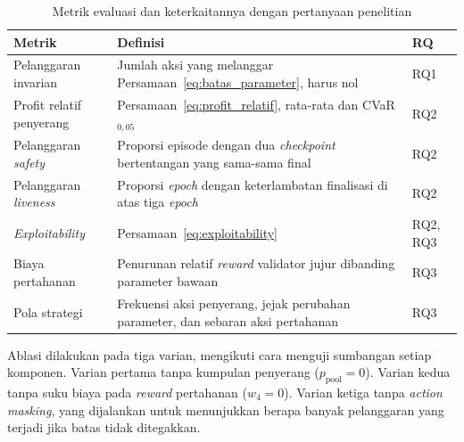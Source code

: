 \begin{table}[htbp]
\centering
\caption{Metrik evaluasi dan keterkaitannya dengan pertanyaan penelitian}
\label{tab:metrik}
\small
\begin{tabular}{|p{3.4cm}|p{6.6cm}|p{2.2cm}|}
\hline
\textbf{Metrik} & \textbf{Definisi} & \textbf{RQ} \\
\hline
Pelanggaran invarian & Jumlah aksi yang melanggar Persamaan~\eqref{eq:batas_parameter}, harus nol & RQ1 \\
\hline
Profit relatif penyerang & Persamaan~\eqref{eq:profit_relatif}, rata-rata dan CVaR$_{0{,}05}$ & RQ2 \\
\hline
Pelanggaran \textit{safety} & Proporsi episode dengan dua \textit{checkpoint} bertentangan yang sama-sama final & RQ2 \\
\hline
Pelanggaran \textit{liveness} & Proporsi \textit{epoch} dengan keterlambatan finalisasi di atas tiga \textit{epoch} & RQ2 \\
\hline
\textit{Exploitability} & Persamaan~\eqref{eq:exploitability} & RQ2, RQ3 \\
\hline
Biaya pertahanan & Penurunan relatif \textit{reward} validator jujur dibanding parameter bawaan & RQ3 \\
\hline
Pola strategi & Frekuensi aksi penyerang, jejak perubahan parameter, dan sebaran aksi pertahanan & RQ3 \\
\hline
\end{tabular}
\end{table}

Ablasi dilakukan pada tiga varian, mengikuti cara \textcite{wushishi2026coadam} menguji sumbangan setiap komponen. Varian pertama tanpa kumpulan penyerang ($p_{\text{pool}} = 0$). Varian kedua tanpa suku biaya pada \textit{reward} pertahanan ($w_4 = 0$). Varian ketiga tanpa \textit{action masking}, yang dijalankan untuk menunjukkan berapa banyak pelanggaran yang terjadi jika batas tidak ditegakkan.

